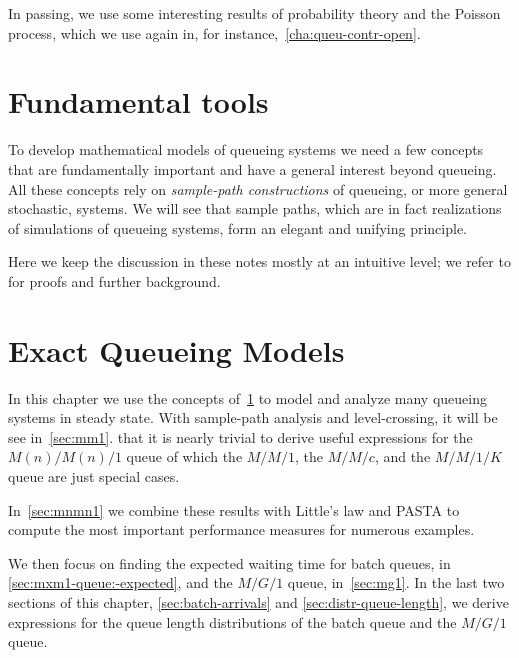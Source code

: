 In passing, we use some interesting results of probability theory and the Poisson process, which we use again in, for instance,~\cref{cha:queu-contr-open}.







\chapter{Fundamental tools}
\label{cha:fundamental-tools}


To develop mathematical models of queueing systems we need a few concepts that are fundamentally important and have a general interest beyond queueing.
All these concepts rely on \emph{sample-path constructions} of queueing, or more general stochastic, systems.
We will see that sample paths, which are in fact realizations of simulations of queueing systems, form an elegant and unifying principle.

Here we keep the discussion in these notes mostly at an intuitive level; we refer to \cite{el-taha98:_sampl_path_analy_queuein_system} for proofs and further background.








\chapter{Exact Queueing Models}
\label{cha:analytical-models}

In this chapter we use the concepts of~\cref{cha:fundamental-tools} to model and analyze many queueing systems in steady state.
With sample-path analysis and level-crossing, it will be see in~\cref{sec:mm1}.
that it is nearly trivial to derive useful expressions for the $M(n)/M(n)/1$ queue of which the $M/M/1$, the $M/M/c$, and the $M/M/1/K$ queue  are just special cases.

In~\cref{sec:mnmn1} we combine these results with Little's law and PASTA to compute the most important performance measures for numerous examples.

We then focus on finding the expected waiting time for batch queues, in \cref{sec:mxm1-queue:-expected}, and the $M/G/1$ queue, in~\cref{sec:mg1}.
In the last two sections of this chapter,  \cref{sec:batch-arrivals} and \cref{sec:distr-queue-length}, we derive expressions for the queue length distributions of the batch queue and the $M/G/1$ queue.

